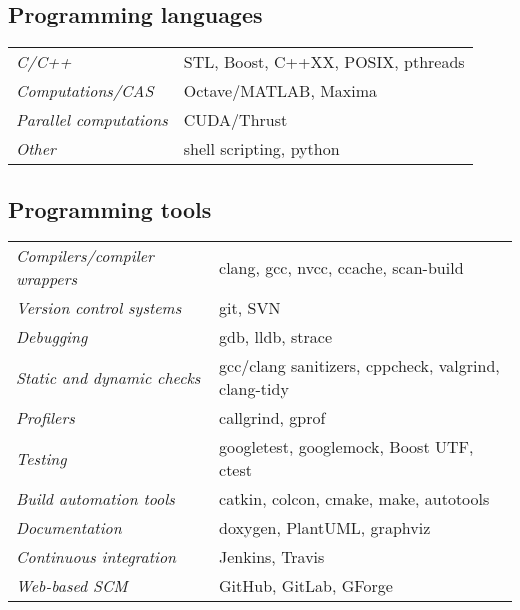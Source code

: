 \documentclass[a4paper,10pt]{report}
\begin{document}
\begin{adjustwidth}{0.5cm}{0pt}
\vspace{0.2cm}
\subsection{Programming languages}
\begin{adjustwidth}{0.5cm}{0pt}
    \begin{tabularx}{\linewidth}{l X}
        {\it C/C++}                 &   STL, Boost, C++XX, POSIX, pthreads\\
        {\it Computations/CAS}      &   Octave/MATLAB, Maxima\\
        {\it Parallel computations} &   CUDA/Thrust\\
        {\it Other}                 &   shell scripting, python
    \end{tabularx}
\end{adjustwidth}

\vspace{0.2cm}
\subsection{Programming tools}
\begin{adjustwidth}{0.5cm}{0pt}
    \begin{tabularx}{\linewidth}{l X}
        {\it Compilers/compiler wrappers}   & clang, gcc, nvcc, ccache, scan-build \\
        {\it Version control systems}       & git, SVN \\
        {\it Debugging}                     & gdb, lldb, strace \\
        {\it Static and dynamic checks}     & gcc/clang sanitizers, cppcheck, valgrind, clang-tidy \\
        {\it Profilers}                     & callgrind, gprof \\
        {\it Testing}                       & googletest, googlemock, Boost UTF, ctest \\
        {\it Build automation tools}        & catkin, colcon, cmake, make, autotools \\
        {\it Documentation}                 & doxygen, PlantUML, graphviz \\
        {\it Continuous integration}        & Jenkins, Travis \\
        {\it Web-based SCM}                 & GitHub, GitLab, GForge
    \end{tabularx}
\end{adjustwidth}


\end{adjustwidth}
\end{document}
